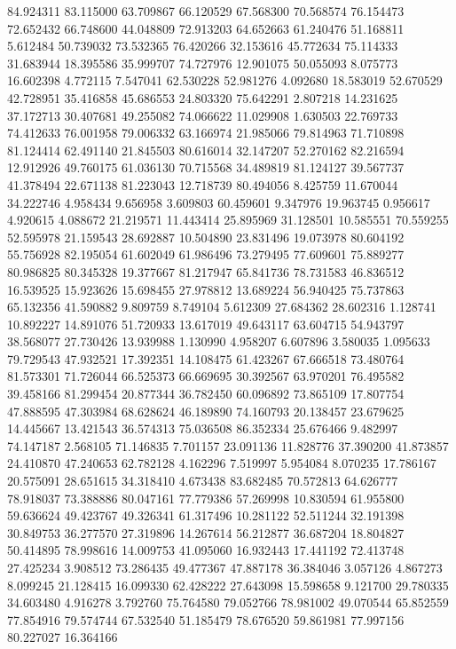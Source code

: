 84.924311
83.115000
63.709867
66.120529
67.568300
70.568574
76.154473
72.652432
66.748600
44.048809
72.913203
64.652663
61.240476
51.168811
5.612484
50.739032
73.532365
76.420266
32.153616
45.772634
75.114333
31.683944
18.395586
35.999707
74.727976
12.901075
50.055093
8.075773
16.602398
4.772115
7.547041
62.530228
52.981276
4.092680
18.583019
52.670529
42.728951
35.416858
45.686553
24.803320
75.642291
2.807218
14.231625
37.172713
30.407681
49.255082
74.066622
11.029908
1.630503
22.769733
74.412633
76.001958
79.006332
63.166974
21.985066
79.814963
71.710898
81.124414
62.491140
21.845503
80.616014
32.147207
52.270162
82.216594
12.912926
49.760175
61.036130
70.715568
34.489819
81.124127
39.567737
41.378494
22.671138
81.223043
12.718739
80.494056
8.425759
11.670044
34.222746
4.958434
9.656958
3.609803
60.459601
9.347976
19.963745
0.956617
4.920615
4.088672
21.219571
11.443414
25.895969
31.128501
10.585551
70.559255
52.595978
21.159543
28.692887
10.504890
23.831496
19.073978
80.604192
55.756928
82.195054
61.602049
61.986496
73.279495
77.609601
75.889277
80.986825
80.345328
19.377667
81.217947
65.841736
78.731583
46.836512
16.539525
15.923626
15.698455
27.978812
13.689224
56.940425
75.737863
65.132356
41.590882
9.809759
8.749104
5.612309
27.684362
28.602316
1.128741
10.892227
14.891076
51.720933
13.617019
49.643117
63.604715
54.943797
38.568077
27.730426
13.939988
1.130990
4.958207
6.607896
3.580035
1.095633
79.729543
47.932521
17.392351
14.108475
61.423267
67.666518
73.480764
81.573301
71.726044
66.525373
66.669695
30.392567
63.970201
76.495582
39.458166
81.299454
20.877344
36.782450
60.096892
73.865109
17.807754
47.888595
47.303984
68.628624
46.189890
74.160793
20.138457
23.679625
14.445667
13.421543
36.574313
75.036508
86.352334
25.676466
9.482997
74.147187
2.568105
71.146835
7.701157
23.091136
11.828776
37.390200
41.873857
24.410870
47.240653
62.782128
4.162296
7.519997
5.954084
8.070235
17.786167
20.575091
28.651615
34.318410
4.673438
83.682485
70.572813
64.626777
78.918037
73.388886
80.047161
77.779386
57.269998
10.830594
61.955800
59.636624
49.423767
49.326341
61.317496
10.281122
52.511244
32.191398
30.849753
36.277570
27.319896
14.267614
56.212877
36.687204
18.804827
50.414895
78.998616
14.009753
41.095060
16.932443
17.441192
72.413748
27.425234
3.908512
73.286435
49.477367
47.887178
36.384046
3.057126
4.867273
8.099245
21.128415
16.099330
62.428222
27.643098
15.598658
9.121700
29.780335
34.603480
4.916278
3.792760
75.764580
79.052766
78.981002
49.070544
65.852559
77.854916
79.574744
67.532540
51.185479
78.676520
59.861981
77.997156
80.227027
16.364166
